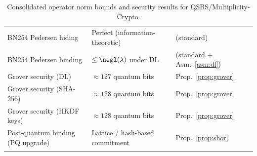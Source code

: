 \documentclass[11pt,letterpaper]{article}
\begin{document}
\begin{center}
\begin{longtable}{@{}>{\small}l>{\small}l>{\small}l@{}}
BN254 Pedersen hiding & Perfect (information-theoretic) & (standard) \\
BN254 Pedersen binding & $\leq\negl(\lambda)$ under DL & (standard + Asm.~\ref{asm:dl}) \\
Grover security (DL) & $\approx 127$ quantum bits & Prop.~\ref{prop:grover} \\
Grover security (SHA-256) & $\approx 128$ quantum bits & Prop.~\ref{prop:grover} \\
Grover security (HKDF keys) & $\approx 128$ quantum bits & Prop.~\ref{prop:grover} \\
Post-quantum binding (PQ upgrade) & Lattice / hash-based commitment & Prop.~\ref{prop:shor} \\
\bottomrule
\caption{Consolidated operator norm bounds and security results for QSBS/Multiplicity-Crypto.}
\end{longtable}
\end{center}
\nocite{*}
  

\end{document}
